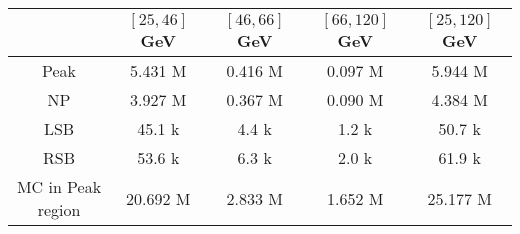 \begin{tabular}{c|ccc|c}
 & $[25, 46]$ GeV & $[46, 66]$ GeV & $[66, 120]$ GeV & $[25, 120]$ GeV \\
\hline
Peak & 5.431 M & 0.416 M & 0.097 M & 5.944 M \\
NP & 3.927 M & 0.367 M & 0.090 M & 4.384 M \\
LSB & 45.1 k & 4.4 k & 1.2 k & 50.7 k \\
RSB & 53.6 k & 6.3 k & 2.0 k & 61.9 k \\
MC in Peak region & 20.692 M & 2.833 M & 1.652 M & 25.177 M \\
\end{tabular}
